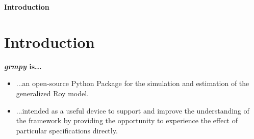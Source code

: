 \begin{frame}\begin{center}
\LARGE\textbf{Introduction}
\end{center}\end{frame}

\section{Introduction}

\begin{frame}
\textbf{\textit{grmpy} is...}


   \begin{itemize}\setlength\itemsep{1em}
      \item ...an open-source Python Package for the simulation and estimation of the generalized Roy model.
      \item ...intended as a useful device to support and improve the understanding of the framework by providing the opportunity to experience the effect of particular specifications directly.
    \end{itemize}

\end{frame}
